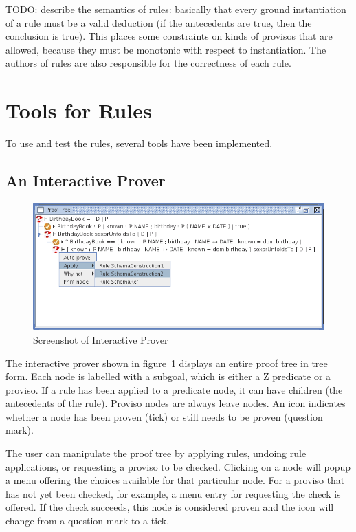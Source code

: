 \documentclass{entcs}
\begin{document}
TODO: describe the semantics of rules: basically that every ground
instantiation of a rule must be a valid deduction (if the antecedents
are true, then the conclusion is true).  This places some constraints
on kinds of provisos that are allowed, because they must be monotonic
with respect to instantiation.  The authors of rules are also
responsible for the correctness of each rule.  


\section{Tools for Rules} \label{sec:tools}

To use and test the rules, several tools have been implemented.

\subsection{An Interactive Prover}

\begin{figure}[htbp]
  \centering
  \includegraphics[width=\textwidth]{cztprover1}
  \caption{Screenshot of Interactive Prover}
  \label{fig:cztprover}
\end{figure}

The interactive prover shown in figure~\ref{fig:cztprover} displays an
entire proof tree in tree form.  Each node is labelled with a subgoal,
which is either a Z predicate or a proviso.  If a rule has been
applied to a predicate node, it can have children (the antecedents of
the rule).  Proviso nodes are always leave nodes.  An icon indicates
whether a node has been proven (tick) or still needs to be proven
(question mark).

The user can manipulate the proof tree by applying rules,
undoing rule applications, or requesting a proviso to be checked.
Clicking on a node will popup a menu offering the choices available
for that particular node.  For a proviso that has not yet been
checked, for example, a menu entry for requesting the check is
offered.  If the check succeeds, this node is considered proven and
the icon will change from a question mark to a tick.
\end{document}
